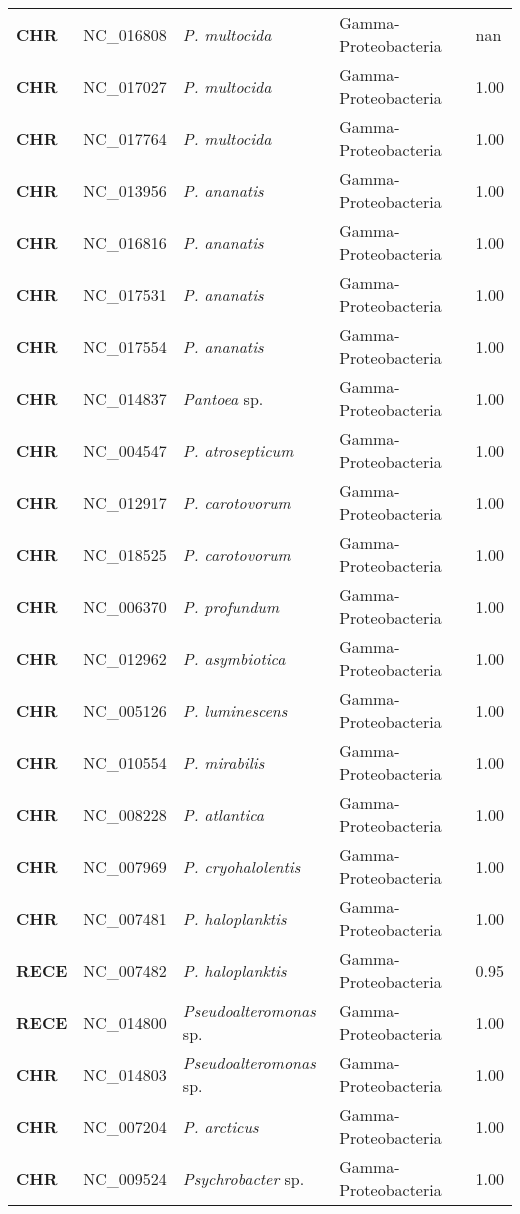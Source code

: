 \begin{adjustwidth}{-3cm}{2cm}
{\begin{supertabular}{>{\bfseries}l|p{0.1\textwidth}p{0.14\textwidth}l|l}
CHR & NC\_016808 & \textit{P. multocida} & Gamma-Proteobacteria & nan\\
CHR & NC\_017027 & \textit{P. multocida} & Gamma-Proteobacteria & 1.00\\
CHR & NC\_017764 & \textit{P. multocida} & Gamma-Proteobacteria & 1.00\\
CHR & NC\_013956 & \textit{P. ananatis} & Gamma-Proteobacteria & 1.00\\
CHR & NC\_016816 & \textit{P. ananatis} & Gamma-Proteobacteria & 1.00\\
CHR & NC\_017531 & \textit{P. ananatis} & Gamma-Proteobacteria & 1.00\\
CHR & NC\_017554 & \textit{P. ananatis} & Gamma-Proteobacteria & 1.00\\
CHR & NC\_014837 & \textit{Pantoea} sp. & Gamma-Proteobacteria & 1.00\\
CHR & NC\_004547 & \textit{P. atrosepticum} & Gamma-Proteobacteria & 1.00\\
CHR & NC\_012917 & \textit{P. carotovorum} & Gamma-Proteobacteria & 1.00\\
CHR & NC\_018525 & \textit{P. carotovorum} & Gamma-Proteobacteria & 1.00\\
CHR & NC\_006370 & \textit{P. profundum} & Gamma-Proteobacteria & 1.00\\
CHR & NC\_012962 & \textit{P. asymbiotica} & Gamma-Proteobacteria & 1.00\\
CHR & NC\_005126 & \textit{P. luminescens} & Gamma-Proteobacteria & 1.00\\
CHR & NC\_010554 & \textit{P. mirabilis} & Gamma-Proteobacteria & 1.00\\
CHR & NC\_008228 & \textit{P. atlantica} & Gamma-Proteobacteria & 1.00\\
CHR & NC\_007969 & \textit{P. cryohalolentis} & Gamma-Proteobacteria & 1.00\\
CHR & NC\_007481 & \textit{P. haloplanktis} & Gamma-Proteobacteria & 1.00\\
RECE & NC\_007482 & \textit{P. haloplanktis} & Gamma-Proteobacteria & 0.95\\
RECE & NC\_014800 & \textit{Pseudoalteromonas} sp. & Gamma-Proteobacteria & 1.00\\
CHR & NC\_014803 & \textit{Pseudoalteromonas} sp. & Gamma-Proteobacteria & 1.00\\
CHR & NC\_007204 & \textit{P. arcticus} & Gamma-Proteobacteria & 1.00\\
CHR & NC\_009524 & \textit{Psychrobacter} sp. & Gamma-Proteobacteria & 1.00\\

\end{supertabular}}
\end{adjustwidth}
